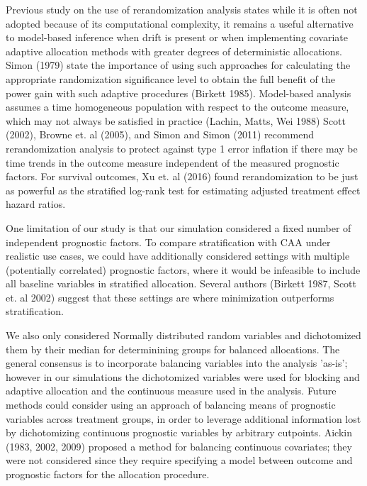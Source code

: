 Previous study on the use of rerandomization analysis states while it is often not adopted because of its computational complexity, it remains a useful alternative to model-based inference when drift is present or when implementing covariate adaptive allocation methods with greater degrees of deterministic allocations.
Simon (1979) state the importance of using such approaches for calculating the appropriate randomization significance level to obtain the full benefit of the power gain with such adaptive procedures (Birkett 1985).
Model-based analysis assumes a time homogeneous population with respect to the outcome measure, which may not always be satisfied in practice (Lachin, Matts, Wei 1988)
Scott (2002), Browne et. al (2005), and Simon and Simon (2011) recommend rerandomization analysis to protect against type 1 error inflation if there may be time trends in the outcome measure independent of the measured prognostic factors.
For survival outcomes, Xu et. al (2016) found rerandomization to be just as powerful as the stratified log-rank test for estimating adjusted treatment effect hazard ratios.

One limitation of our study is that our simulation considered a fixed number of independent prognostic factors.
To compare stratification with CAA under realistic use cases, we could have additionally considered settings with multiple (potentially correlated) prognostic factors, where it would be infeasible to include all baseline variables in stratified allocation.  
Several authors (Birkett 1987, Scott et. al 2002) suggest that these settings are where minimization outperforms stratification.

We also only considered Normally distributed random variables and dichotomized them by their median for determinining groups for balanced allocations.
The general consensus is to incorporate balancing variables into the analysis 'as-is'; however in our simulations the dichotomized variables were used for blocking and adaptive allocation and the continuous measure used in the analysis.
Future methods could consider using an approach of balancing means of prognostic variables across treatment groups, in order to leverage additional information lost by dichotomizing continuous prognostic variables by arbitrary cutpoints.
Aickin (1983, 2002, 2009) proposed a method for balancing continuous covariates; they were not considered since they require specifying a model between outcome and prognostic factors for the allocation procedure.

